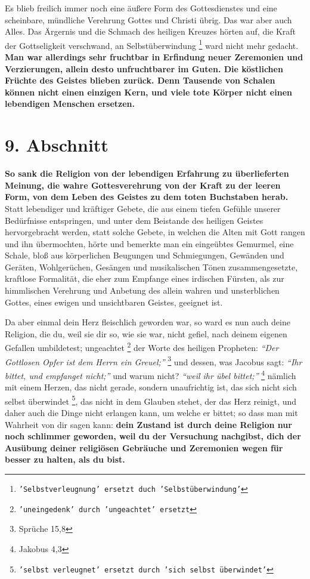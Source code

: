 \medskip 

Es blieb freilich immer noch eine äußere Form des Gottesdienstes und eine
scheinbare, mündliche Verehrung Gottes und Christi übrig. Das war aber auch
Alles. Das Ärgernis und die Schmach des heiligen Kreuzes hörten auf, die Kraft
der Gottseligkeit verschwand, an Selbstüberwindung
\footnote{\texttt{'Selbstverleugnung' ersetzt duch 'Selbstüberwindung'}}
ward nicht mehr gedacht. \textbf{Man
war allerdings sehr fruchtbar in Erfindung neuer Zeremonien und Verzierungen,
allein desto unfruchtbarer im Guten. Die köstlichen Früchte des Geistes blieben
zurück. Denn Tausende von Schalen können nicht einen einzigen Kern, und viele
tote Körper nicht einen lebendigen Menschen ersetzen.}

\section{9. Abschnitt}  \label{kap2_ab9}

\textbf{So sank die Religion von der lebendigen Erfahrung zu überlieferten
Meinung,
die wahre Gottesverehrung von der Kraft zu der leeren Form, von dem Leben des
Geistes zu dem toten Buchstaben herab.} Statt lebendiger und kräftiger Gebete,
die aus einem tiefen Gefühle unserer Bedürfnisse entspringen, und unter dem
Beistande des heiligen Geistes hervorgebracht werden, statt solche Gebete,
in welchen die Alten mit Gott rangen und ihn übermochten,
hörte und bemerkte man ein
eingeübtes Gemurmel, eine Schale, bloß aus körperlichen Beugungen und
Schmiegungen, Gewänden und Geräten, Wohlgerüchen, Gesängen und musikalischen
Tönen zusammengesetzte, kraftlose Formalität, die eher zum Empfange eines
irdischen Fürsten, als zur himmlischen Verehrung und Anbetung des allein wahren
und unsterblichen Gottes, eines ewigen und unsichtbaren Geistes, geeignet ist.

\medskip 

Da aber einmal dein Herz fleischlich geworden war, so ward es nun auch deine
Religion, die du, weil sie dir so, wie sie war, nicht gefiel, nach deinem
eigenen Gefallen umbildetest; ungeachtet
\footnote{\texttt{'uneingedenk' durch 'ungeachtet' ersetzt}}
der Worte des heiligen Propheten:
\textit{"`Der Gottlosen Opfer ist dem Herrn ein Greuel;"'}
\footnote{Sprüche 15,8}
 und
dessen, was Jacobus sagt:
\textit{"`Ihr bittet, und empfanget nicht;"'} und warum
nicht? \textit{"`weil ihr übel bittet;"'}
\footnote{Jakobus 4,3}
 nämlich mit einem
Herzen, das nicht gerade, sondern unaufrichtig ist, das sich nicht sich
selbst überwindet
\footnote{\texttt{'selbst verleugnet' ersetzt durch 'sich selbst überwindet'}},
das nicht in dem Glauben stehet, der das Herz reinigt,
und daher
auch die Dinge nicht erlangen kann, um welche er bittet; so dass man mit
Wahrheit von dir sagen kann: \textbf{dein Zustand ist durch deine Religion nur
noch
schlimmer geworden, weil du der Versuchung nachgibst, dich der Ausübung
deiner religiösen Gebräuche und Zeremonien wegen für besser zu halten, als du
bist.}

